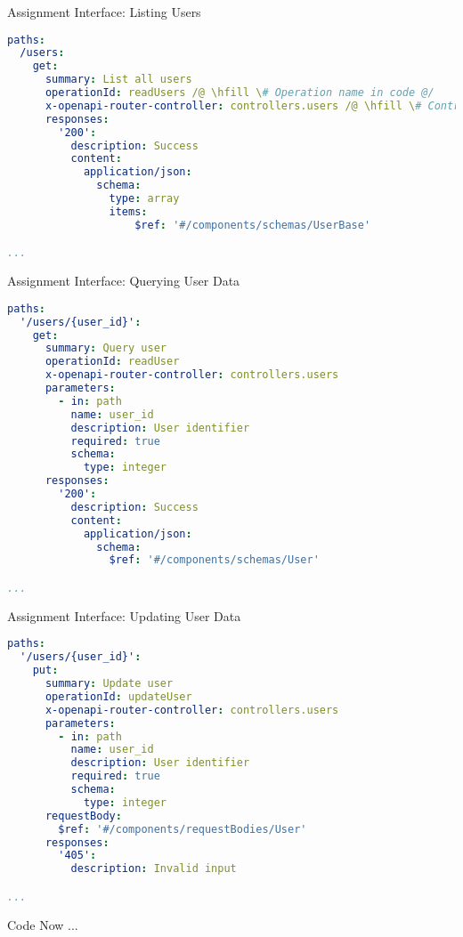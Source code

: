 \begin{frame}[fragile]{Assignment Interface: Listing Users}
\begin{lstlisting}[language=yaml,style=mini]
paths:
  /users:
    get:
      summary: List all users
      operationId: readUsers /@ \hfill \# Operation name in code @/
      x-openapi-router-controller: controllers.users /@ \hfill \# Controller name in code @/
      responses:
        '200':
          description: Success
          content:
            application/json:
              schema:
                type: array
                items:
                    $ref: '#/components/schemas/UserBase'

...
\end{lstlisting}
\end{frame}


\begin{frame}[fragile]{Assignment Interface: Querying User Data}
\begin{lstlisting}[language=yaml,style=mini]
paths:
  '/users/{user_id}':
    get:
      summary: Query user
      operationId: readUser
      x-openapi-router-controller: controllers.users
      parameters:
        - in: path
          name: user_id
          description: User identifier
          required: true
          schema:
            type: integer
      responses:
        '200':
          description: Success
          content:
            application/json:
              schema:
                $ref: '#/components/schemas/User'

...
\end{lstlisting}
\end{frame}


\begin{frame}[fragile]{Assignment Interface: Updating User Data}
\begin{lstlisting}[language=yaml,style=mini]
paths:
  '/users/{user_id}':
    put:
      summary: Update user
      operationId: updateUser
      x-openapi-router-controller: controllers.users
      parameters:
        - in: path
          name: user_id
          description: User identifier
          required: true
          schema:
            type: integer
      requestBody:
        $ref: '#/components/requestBodies/User'
      responses:
        '405':
          description: Invalid input

...
\end{lstlisting}
\end{frame}


\begin{frame}{Code Now ...}
\end{frame}


